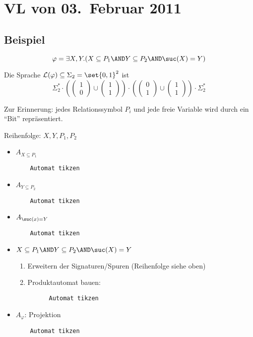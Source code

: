\section{VL von 03.~Februar 2011}

\subsection{Beispiel}

\[
  \varphi = \exists X,Y.(X\subseteq P_1 \AND Y\subseteq P_2 \AND \suc(X) = Y)
\]

Die Sprache $\mathcal{L}(\varphi)\subseteq\Sigma_2=\set{0,1}^2$ ist
\[
  \Sigma_2^* \cdot \left(
    \begin{pmatrix} 1\\0 \end{pmatrix}
    \cup
    \begin{pmatrix} 1\\1 \end{pmatrix}
  \right)
  \cdot \left(
    \begin{pmatrix} 0\\1 \end{pmatrix}
    \cup
    \begin{pmatrix} 1\\1 \end{pmatrix}
  \right)
  \cdot \Sigma_2^*
\]

Zur Erinnerung: jedes Relationssymbol $P_i$ und jede freie Variable
wird durch ein \enquote{Bit} repräsentiert.

Reihenfolge: $X,Y,P_1,P_2$

\begin{itemize}
  \item $A_{X\subseteq P_1}$
  \begin{verbatim}
    Automat tikzen
  \end{verbatim}

  \item $A_{Y\subseteq P_2}$
  \begin{verbatim}
    Automat tikzen
  \end{verbatim}

  \item $A_{\suc(x)=Y}$
  \begin{verbatim}
    Automat tikzen
  \end{verbatim}

  \item $X\subseteq P_1 \AND Y\subseteq P_2 \AND \suc(X)=Y$
  \begin{enumerate}
    \item Erweitern der Signaturen/Spuren (Reihenfolge siehe oben)
    \item Produktautomat bauen:
    \begin{verbatim}
      Automat tikzen
    \end{verbatim}
  \end{enumerate}
  
  \item $A_\varphi$: Projektion
  \begin{verbatim}
    Automat tikzen
  \end{verbatim}  
\end{itemize}

